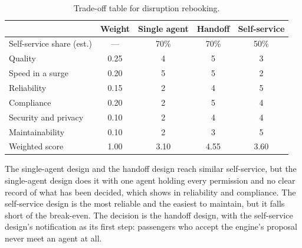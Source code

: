 \begin{table}[htbp]
\centering
\small
\caption{Trade-off table for disruption rebooking.}
\label{tab:air-tradeoff}
\begin{tabular}{@{}lcccc@{}}
\toprule
\rowcolor{coHead} & Weight & Single agent & Handoff & Self-service \\
\midrule
Self-service share (est.) & --- & 70\% & 70\% & 50\% \\
\midrule
Quality & 0.25 & 4 & 5 & 3 \\
Speed in a surge & 0.20 & 5 & 5 & 2 \\
Reliability & 0.15 & 2 & 4 & 5 \\
Compliance & 0.20 & 2 & 5 & 4 \\
Security and privacy & 0.10 & 2 & 4 & 4 \\
Maintainability & 0.10 & 2 & 3 & 5 \\
\midrule
\rowcolor{coAmberBg} Weighted score & 1.00 & 3.10 & 4.55 & 3.60 \\
\bottomrule
\end{tabular}
\end{table}

The single-agent design and the handoff design reach similar self-service, but the single-agent design does it with one agent holding every permission and no clear record of what has been decided, which shows in reliability and compliance. The self-service design is the most reliable and the easiest to maintain, but it falls short of the break-even. The decision is the handoff design, with the self-service design's notification as its first step: passengers who accept the engine's proposal never meet an agent at all.
